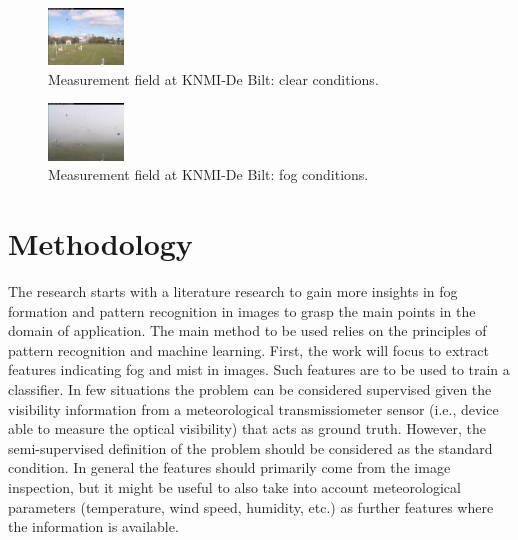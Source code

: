 \documentclass[conference]{IEEEtran}
\begin{document}
		\begin{figure}[ht]
			\centering
			\includegraphics[width=0.18\textwidth]{Meetterrein_20151009_1110.jpg}	
			\caption{Measurement field at KNMI-De Bilt: clear conditions.}
			\label{fig:clear}
		\end{figure}
		
		
				\begin{figure}[ht]
			\centering
			\includegraphics[width=0.18\textwidth]{Meetterrein_20151009_0800.jpg}	
			\caption{Measurement field at KNMI-De Bilt: fog conditions.}
			\label{fig:fog}
		\end{figure}
\vspace{-0.2cm}
\section{Methodology}
The research starts with a literature research to gain more insights in fog formation and pattern recognition in images to grasp the main points in the domain of application.
The main method to be used relies on the principles of pattern recognition and machine learning. 
First, the work will focus to extract features indicating fog and mist in images. Such features are to be used to train a classifier. 
In few situations the problem can be considered supervised given the visibility information from a 
meteorological transmissiometer sensor (i.e., device able to measure the optical visibility) that acts as ground truth. However, the 
semi-supervised definition of the problem should be considered as the standard condition. In general the features should primarily come from the image inspection, but it might be useful to also take into account meteorological parameters 
(temperature, wind speed, humidity, etc.) as further features where
the information is available.

\vspace{-0.2cm}
\end{document}
